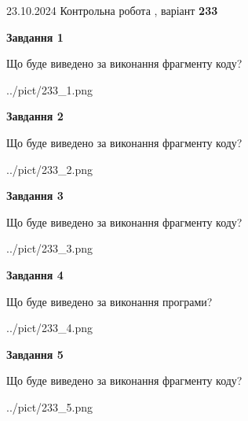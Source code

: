 \documentclass[12pt, ukrainian]{article}
\begin{document}
{\Large{23.10.2024 Контрольна робота , варіант  \No \textbf { 233 }\par}}
{
\begin {large}
{\begin {center}\textbf{Завдання 1}\end {center}}

Що буде виведено за виконання фрагменту коду?\par
\begin{center}
	{../pict/233_1.png}
\end{center}
\newpage

{\begin {center}\textbf{Завдання 2}\end {center}}

Що буде виведено за виконання фрагменту коду?\par
\begin{center}
	{../pict/233_2.png}
\end{center}
\newpage

{\begin {center}\textbf{Завдання 3}\end {center}}

Що буде виведено за виконання фрагменту коду?\par
\begin{center}
	{../pict/233_3.png}
\end{center}
\newpage

{\begin {center}\textbf{Завдання 4}\end {center}}

Що буде виведено за виконання програми?\par
\begin{center}
	{../pict/233_4.png}
\end{center}
\newpage

{\begin {center}\textbf{Завдання 5}\end {center}}

Що буде виведено за виконання фрагменту коду?\par
\begin{center}
	{../pict/233_5.png}
\end{center}
\newpage


\end{large}}
\end{document}
